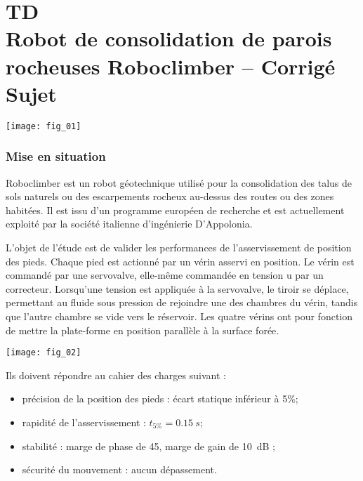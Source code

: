 \chapter*{TD  \\ 
Robot de consolidation de parois rocheuses Roboclimber -- \ifprof Corrigé \else Sujet \fi}


\iflivret {} \else
\ifprof  {} \else \fi
\fi
\setcounter{question}{0}

\begin{marginfigure}
\centering
\texttt{[image: fig\_01]}
\end{marginfigure}


\subsection*{Mise en situation}
Roboclimber est un robot géotechnique utilisé pour la consolidation des talus de sols naturels
ou des escarpements rocheux au-dessus des routes ou des zones habitées. Il est
issu d’un programme européen de recherche et est actuellement exploité par la société italienne
d’ingénierie D’Appolonia.



L’objet de l’étude est de valider les performances de l’asservissement de position des pieds.
Chaque pied est actionné par un vérin asservi en position. Le vérin est commandé par une
servovalve, elle-même commandée en tension u par un correcteur. Lorsqu’une
tension est appliquée à la servovalve, le tiroir se déplace, permettant au fluide sous pression de
rejoindre une des chambres du vérin, tandis que l’autre chambre se vide vers le réservoir.
Les quatre vérins ont pour fonction de mettre la plate-forme en position parallèle à la surface
forée. 



\begin{marginfigure}
\texttt{[image: fig\_02]}
\end{marginfigure}
Ils doivent répondre au cahier des charges suivant :
\begin{itemize}
\item précision de la position des pieds : écart statique inférieur à 5\%;
\item rapidité de l’asservissement : $t_{5\%} = \SI{0,15}{s}$;
\item stabilité : marge de phase de 45\degres, marge de gain de \SI{10}{dB} ;
\item sécurité du mouvement : aucun dépassement.
\end{itemize}

